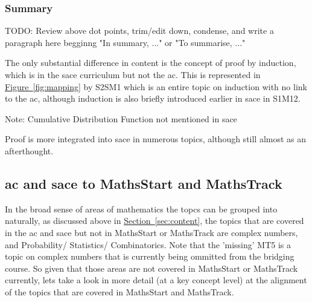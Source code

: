 \documentclass[twoside,12pt,a4paper]{report}
\newcommand{\refsec}[1]{\hyperref[sec:#1]{Section~\ref{sec:#1}}}
\newcommand{\reffig}[1]{\hyperref[fig:#1]{Figure~\ref{fig:#1}}}
\begin{document}
\subsubsection{Summary}

TODO: Review above dot points, trim/edit down, condense, and write a paragraph here begginng "In summary, ..." or "To summarise, ..." 

The only substantial difference in content is the concept of proof by induction, which is in the \gls{sace} curriculum but not the \gls{ac}. This is represented in \reffig{mapping} by S2SM1 which is an entire topic on induction with no link to the \gls{ac}, although induction is also briefly introduced earlier in \gls{sace} in S1M12.

Note: Cumulative Distribution Function not mentioned in \gls{sace}

Proof is more integrated into \gls{sace} in numerous topics, although still almost as an afterthought.


\subsection{\gls{ac} and \gls{sace} to MathsStart and MathsTrack}

In the broad sense of areas of mathematics the topcs can be grouped into naturally, as discussed above in \refsec{content}, the topics that are covered in the \gls{ac} and \gls{sace} but not in MathsStart or MathsTrack are complex numbers, and Probability/ Statistics/ Combinatorics. Note that the 'missing' MT5 is a topic on complex numbers that is currently being ommitted from the bridging course. So given that those areas are not covered in MathsStart or MathsTrack currently, lets take a look in more detail (at a key concept level) at the alignment of the topics that are covered in MathsStart and MathsTrack.
\end{document}
